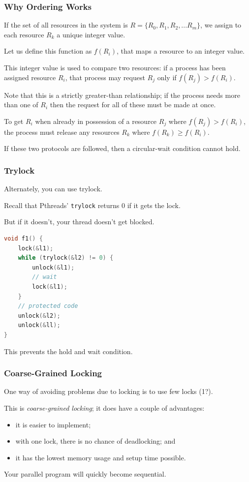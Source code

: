 \begin{frame}
\frametitle{Why Ordering Works}

If the set of all resources in the system is $R = \{R_{0}, R_{1}, R_{2}, ... R_{m}\}$, we assign to each resource $R_{k}$ a unique integer value. 

Let us define this function as $f(R_{i})$, that maps a resource to an integer value. 

This integer value is used to compare two resources: if a process has been assigned resource $R_{i}$, that process may request $R_{j}$ only if $f(R_{j}) > f(R_{i})$. 

Note that this is a strictly greater-than relationship; if the process needs more than one of $R_{i}$ then the request for all of these must be made at once.

To get $R_{i}$ when already in possession of a resource $R_{j}$ where $f(R_{j}) > f(R_{i})$, the process must release any resources $R_{k}$ where $f(R_{k}) \geq f(R_{i})$. 

If these two protocols are followed, then a circular-wait condition cannot hold.


\end{frame}


\begin{frame}[fragile]
\frametitle{Trylock}

Alternately, you can use trylock. 

Recall that Pthreads' {\tt trylock} returns 0 if it gets the lock. 

But if it doesn't, your thread doesn't get blocked. 

\begin{lstlisting}[language=C]
void f1() {
    lock(&l1);
    while (trylock(&l2) != 0) {
        unlock(&l1);
        // wait
        lock(&l1);
    }
    // protected code
    unlock(&l2);
    unlock(&ll);    
}
\end{lstlisting}

This prevents the hold and wait condition.

\end{frame}


\begin{frame}
\frametitle{Coarse-Grained Locking}

One way of avoiding problems due to locking is to use few locks
(1?). 

This is \emph{coarse-grained locking}; it does have a couple of advantages:
  \begin{itemize}
    \item it is easier to implement;
    \item with one lock, there is no chance of deadlocking; and
    \item it has the lowest memory usage and setup time possible.
  \end{itemize}

Your parallel program will quickly become sequential.


\end{frame}


